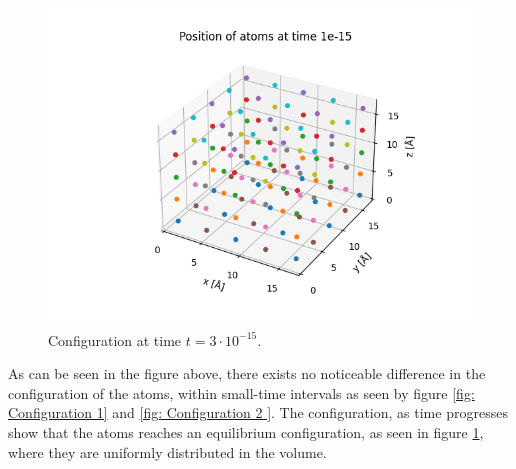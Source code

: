 \documentclass[a4paper]{article}
\begin{document}
\begin{figure}[H]
    \centering
    \includegraphics[scale = .5]{conf_15.png}
    \caption{Configuration at time $t = 3\cdot10^{-15}$.}
    \label{fig: Configuration 3}
\end{figure}\noindent
As can be seen in the figure above, there exists no noticeable difference in the configuration of the atoms, within small-time intervals as seen by figure \ref{fig: Configuration 1} and \ref{fig: Configuration 2 }.
The configuration, as time progresses show that the atoms reaches an equilibrium configuration, as seen in figure \ref{fig: Configuration 3}, where they are uniformly distributed in the volume.
\end{document}
